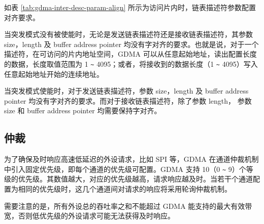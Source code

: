 \documentclass[main\_\_CN.tex]{subfiles}
\begin{document}
如表 \ref{tab:gdma-inter-desc-param-align} 所示为访问片内时，链表描述符参数配置对齐要求。

当突发模式没有被使能时，无论是发送链表描述符还是接收链表描述符，其参数 size，length 及 buffer address pointer 均没有字对齐的要求。也就是说，对于一个描述符，在可访问的片内地址空间，GDMA 可以从任意起始地址，读出配置长度的数据，长度取值范围为 1 \verb+~+ 4095；或者，将接收到的数据长度（1 \verb+~+ 4095）写入任意起始地址开始的连续地址。

当突发模式使能时，对于发送链表描述符，参数 size，length 及 buffer address pointer 均没有字对齐的要求。而对于接收链表描述符，除了参数 length， 参数 size 和 buffer address pointer 均需要保持字对齐。


\subsection{仲裁}

为了确保及时响应高速低延迟的外设请求，比如 SPI 等，GDMA 在通道仲裁机制中引入固定优先级，即每个通道的优先级可配置。GDMA 支持 10（0 \verb+~+ 9）个等级的优先级。其数值越大，对应的优先级越高，请求响应越及时。当若干个通道配置为相同的优先级时，这几个通道间对请求的响应将采用轮询仲裁机制。

需要注意的是，所有外设总的吞吐率之和不能超过 GDMA 能支持的最大有效带宽，否则低优先级的外设请求可能无法获得及时响应。
\end{document}
